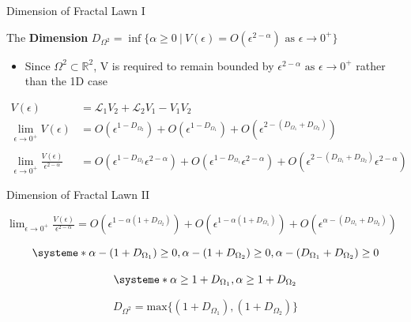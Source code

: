 \documentclass{if-beamer}
\newcommand{\R}{\mathbb{R}}
\newcommand{\SL}{\mathcal{L}}
\newcommand{\Om}{\Omega}
\begin{document}
\begin{frame}{Dimension of Fractal Lawn I}

\begin{definition}
	The {\bf Dimension} $D_{\Om^2} = \inf\{\alpha \geq 0\ |\ V(\epsilon) = O(\epsilon^{2 - \alpha})\text{ as }\epsilon \to 0^+\}$
\end{definition}
\pause
\begin{itemize}
	\item Since $\Om^2 \subset \R^2$, V is required to remain bounded by $\epsilon^{2-\alpha} \text{ as }\epsilon \to 0^+ $ rather than the 1D case   
\end{itemize}
\pause
\vspace{0.2in}

\begin{align*}
V(\epsilon) &= \SL_1 V_2 + \SL_2 V_1 - V_1 V_2 \\
\lim_{\epsilon \to 0^+} V(\epsilon) &= O(\epsilon^{1-D_{\Om_2}}) + O(\epsilon^{1-D_{\Om_1}}) + O(\epsilon^{2-(D_{\Om_1} + D_{\Om_2})}) \\ \\
\lim_{\epsilon \to 0^+} \frac{V(\epsilon)}{\epsilon^{2-\alpha}} &= O(\epsilon^{1-D_{\Om_2}} \epsilon^{2-\alpha}) + O(\epsilon^{1-D_{\Om_1}} \epsilon^{2-\alpha}) + O(\epsilon^{2-(D_{\Om_1} + D_{\Om_2})} \epsilon^{2-\alpha})
\end{align*}

\end{frame}

\begin{frame}{Dimension of Fractal Lawn II}

$\lim_{\epsilon \to 0^+} \frac{V(\epsilon)}{\epsilon^{2-\alpha}} = O(\epsilon^{1 - \alpha (1+D_{\Om_2})}) + O(\epsilon^{1 - \alpha (1+D_{\Om_1})}) + O(\epsilon^{\alpha - (D_{\Om_1} + D_{\Om_2})})$
\pause

\[ 
\systeme*{\alpha - (1 + D_{\Om_1}) \geq 0, \alpha - (1 + D_{\Om_2}) \geq 0, \alpha - (D_{\Om_1} + D_{\Om_2}) \geq 0}
\]
\pause

\[ 
\systeme*{\alpha \geq 1 + D_{\Om_1}, \alpha \geq 1 + D_{\Om_2}}
\]
\pause

\[ 
D_{\Om^2} = \text{max} \{ (1 + D_{\Om_1}), (1 + D_{\Om_2}) \}
\]

\end{frame}
\end{document}
